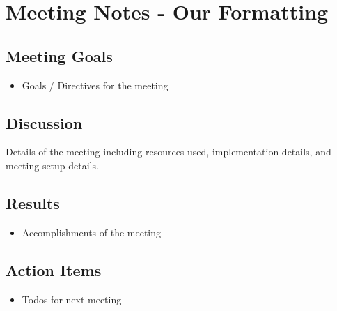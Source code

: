 \section{Meeting Notes - Our Formatting}

\subsection{Meeting Goals}
\begin{itemize}
    \item Goals / Directives for the meeting
\end{itemize}

\subsection{Discussion}
Details of the meeting including resources used, implementation details, and meeting setup details.

\subsection{Results}
\begin{itemize}
    \item Accomplishments of the meeting
\end{itemize}

\subsection{Action Items}
\begin{itemize}
    \item Todos for next meeting
\end{itemize}